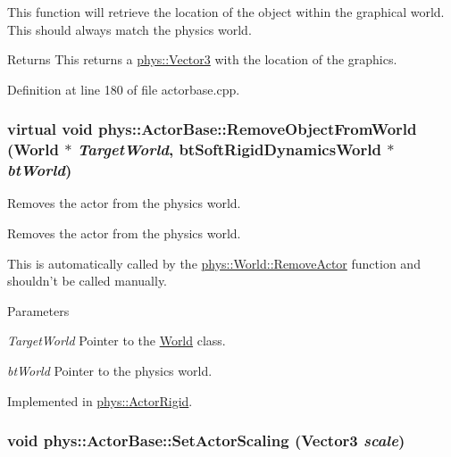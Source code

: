 This function will retrieve the location of the object within the graphical world. This should always match the physics world. \begin{DoxyReturn}{Returns}
This returns a \hyperlink{classphys_1_1Vector3}{phys::Vector3} with the location of the graphics. 
\end{DoxyReturn}


Definition at line 180 of file actorbase.cpp.

\hypertarget{classphys_1_1ActorBase_af669724f10d0bf74f4951c85caa42494}{
\subsubsection[{RemoveObjectFromWorld}]{\setlength{\rightskip}{0pt plus 5cm}virtual void phys::ActorBase::RemoveObjectFromWorld ({\bf World} $\ast$ {\em TargetWorld}, \/  btSoftRigidDynamicsWorld $\ast$ {\em btWorld})}}
\label{d8/d0f/classphys_1_1ActorBase_af669724f10d0bf74f4951c85caa42494}


Removes the actor from the physics world. 

Removes the actor from the physics world. \par
 This is automatically called by the \hyperlink{classphys_1_1World_ab00f84983afcc7f6ef1e5a84367d994d}{phys::World::RemoveActor} function and shouldn't be called manually. 
\begin{DoxyParams}{Parameters}
\item[{\em TargetWorld}]Pointer to the \hyperlink{classphys_1_1World}{World} class. \item[{\em btWorld}]Pointer to the physics world. \end{DoxyParams}


Implemented in \hyperlink{classphys_1_1ActorRigid_a74a4eaa5491b90a977e9db0457271f31}{phys::ActorRigid}.

\hypertarget{classphys_1_1ActorBase_a1ac7c692d7f88f39ebb1c1db5deba251}{
\subsubsection[{SetActorScaling}]{\setlength{\rightskip}{0pt plus 5cm}void phys::ActorBase::SetActorScaling ({\bf Vector3} {\em scale})}}
\label{d8/d0f/classphys_1_1ActorBase_a1ac7c692d7f88f39ebb1c1db5deba251}


